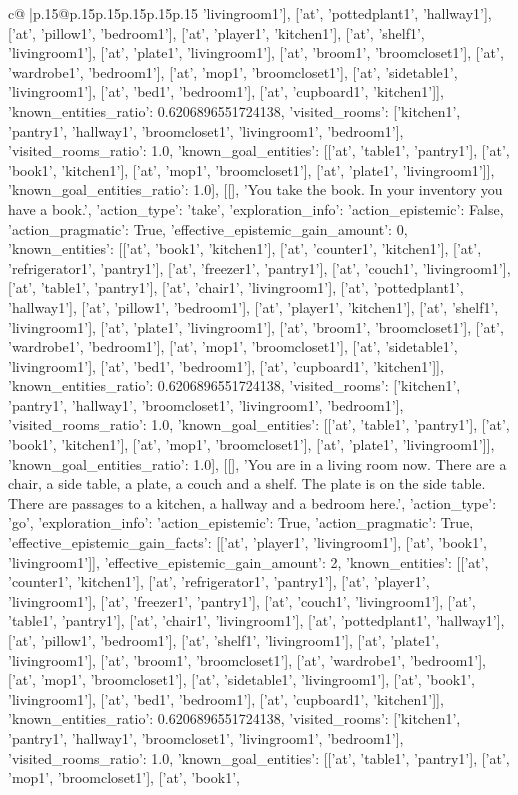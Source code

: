 \documentclass{article}
\begin{document}
{\begin{supertabular}{c@{$\;$}|p{.15\linewidth}@{}p{.15\linewidth}p{.15\linewidth}p{.15\linewidth}p{.15\linewidth}p{.15\linewidth}}
{{{'livingroom1'], ['at', 'pottedplant1', 'hallway1'], ['at', 'pillow1', 'bedroom1'], ['at', 'player1', 'kitchen1'], ['at', 'shelf1', 'livingroom1'], ['at', 'plate1', 'livingroom1'], ['at', 'broom1', 'broomcloset1'], ['at', 'wardrobe1', 'bedroom1'], ['at', 'mop1', 'broomcloset1'], ['at', 'sidetable1', 'livingroom1'], ['at', 'bed1', 'bedroom1'], ['at', 'cupboard1', 'kitchen1']], 'known_entities_ratio': 0.6206896551724138, 'visited_rooms': ['kitchen1', 'pantry1', 'hallway1', 'broomcloset1', 'livingroom1', 'bedroom1'], 'visited_rooms_ratio': 1.0, 'known_goal_entities': [['at', 'table1', 'pantry1'], ['at', 'book1', 'kitchen1'], ['at', 'mop1', 'broomcloset1'], ['at', 'plate1', 'livingroom1']], 'known_goal_entities_ratio': 1.0}}], [[], 'You take the book. In your inventory you have a book.', {'action_type': 'take', 'exploration_info': {'action_epistemic': False, 'action_pragmatic': True, 'effective_epistemic_gain_amount': 0, 'known_entities': [['at', 'book1', 'kitchen1'], ['at', 'counter1', 'kitchen1'], ['at', 'refrigerator1', 'pantry1'], ['at', 'freezer1', 'pantry1'], ['at', 'couch1', 'livingroom1'], ['at', 'table1', 'pantry1'], ['at', 'chair1', 'livingroom1'], ['at', 'pottedplant1', 'hallway1'], ['at', 'pillow1', 'bedroom1'], ['at', 'player1', 'kitchen1'], ['at', 'shelf1', 'livingroom1'], ['at', 'plate1', 'livingroom1'], ['at', 'broom1', 'broomcloset1'], ['at', 'wardrobe1', 'bedroom1'], ['at', 'mop1', 'broomcloset1'], ['at', 'sidetable1', 'livingroom1'], ['at', 'bed1', 'bedroom1'], ['at', 'cupboard1', 'kitchen1']], 'known_entities_ratio': 0.6206896551724138, 'visited_rooms': ['kitchen1', 'pantry1', 'hallway1', 'broomcloset1', 'livingroom1', 'bedroom1'], 'visited_rooms_ratio': 1.0, 'known_goal_entities': [['at', 'table1', 'pantry1'], ['at', 'book1', 'kitchen1'], ['at', 'mop1', 'broomcloset1'], ['at', 'plate1', 'livingroom1']], 'known_goal_entities_ratio': 1.0}}], [[], 'You are in a living room now. There are a chair, a side table, a plate, a couch and a shelf. The plate is on the side table. There are passages to a kitchen, a hallway and a bedroom here.', {'action_type': 'go', 'exploration_info': {'action_epistemic': True, 'action_pragmatic': True, 'effective_epistemic_gain_facts': [['at', 'player1', 'livingroom1'], ['at', 'book1', 'livingroom1']], 'effective_epistemic_gain_amount': 2, 'known_entities': [['at', 'counter1', 'kitchen1'], ['at', 'refrigerator1', 'pantry1'], ['at', 'player1', 'livingroom1'], ['at', 'freezer1', 'pantry1'], ['at', 'couch1', 'livingroom1'], ['at', 'table1', 'pantry1'], ['at', 'chair1', 'livingroom1'], ['at', 'pottedplant1', 'hallway1'], ['at', 'pillow1', 'bedroom1'], ['at', 'shelf1', 'livingroom1'], ['at', 'plate1', 'livingroom1'], ['at', 'broom1', 'broomcloset1'], ['at', 'wardrobe1', 'bedroom1'], ['at', 'mop1', 'broomcloset1'], ['at', 'sidetable1', 'livingroom1'], ['at', 'book1', 'livingroom1'], ['at', 'bed1', 'bedroom1'], ['at', 'cupboard1', 'kitchen1']], 'known_entities_ratio': 0.6206896551724138, 'visited_rooms': ['kitchen1', 'pantry1', 'hallway1', 'broomcloset1', 'livingroom1', 'bedroom1'], 'visited_rooms_ratio': 1.0, 'known_goal_entities': [['at', 'table1', 'pantry1'], ['at', 'mop1', 'broomcloset1'], ['at', 'book1', }}}
\end{supertabular}}
\end{document}
